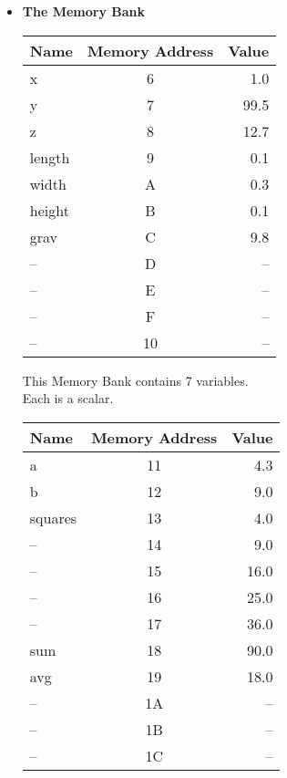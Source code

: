 \documentclass[11pt]{article}
\begin{document}
\begin{itemize}
        
        \large	
	\item \textbf{ \LARGE The Memory Bank}\\
        
        \begin{multicols}{2}			
        \begin{tabular}{ | l | c | r | }
            \hline
             \textbf{Name} & \textbf{Memory Address} & \textbf{Value} \\ \hline\hline\hline
            x & 6  & 1.0 \\ \hline\hline\hline
            y & 7 & 99.5 \\ \hline\hline\hline
            z & 8 & 12.7 \\ \hline\hline\hline
            length & 9 & 0.1 \\ \hline\hline\hline
            width & A & 0.3 \\ \hline\hline\hline
            height & B & 0.1 \\ \hline\hline\hline
            grav & C & 9.8 \\ \hline\hline\hline
            -- & D & -- \\ \hline\hline\hline
            -- & E & -- \\ \hline\hline\hline
            -- & F & -- \\ \hline\hline\hline
            -- & 10 & -- \\ \hline	
        \end{tabular}
	
    \vspace{2mm}
        This Memory Bank contains 7 variables.\\ Each is a scalar.
            
        \begin{tabular}{ | l | c | r | }
            \hline
            \textbf{Name} & \textbf{Memory Address} & \textbf{Value} \\ \hline \hline \hline
            a & 11  & 4.3 \\ \hline\hline\hline
            b & 12 & 9.0 \\ \hline\hline\hline
            squares & 13 & 4.0 \\\hline
            -- & 14 & 9.0 \\ \hline
            -- & 15 & 16.0 \\ \hline
            -- & 16 & 25.0 \\ \hline
            -- & 17 & 36.0 \\ \hline\hline\hline
            sum & 18 & 90.0  \\ \hline\hline\hline
            avg & 19 & 18.0 \\ \hline\hline\hline
            -- & 1A & -- \\ \hline\hline\hline
	 -- & 1B & -- \\ \hline\hline\hline
            -- & 1C & -- \\ \hline
                

\end{tabular}
\end{multicols}
\end{itemize}
\end{document}
